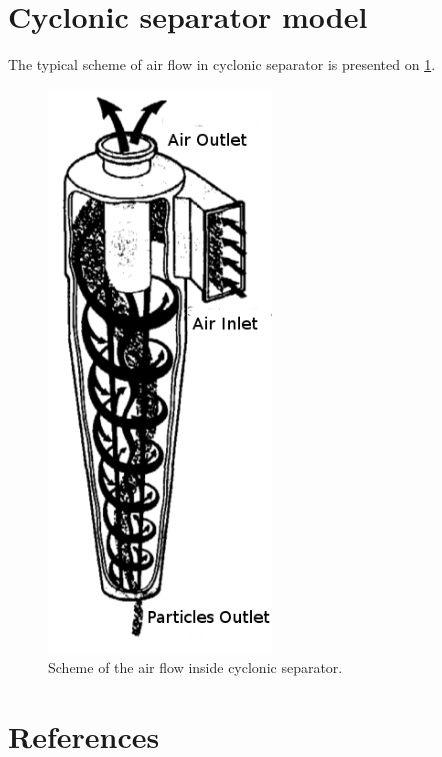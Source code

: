 \documentclass[a4paper]{jpconf}
\begin{document}
\section{Cyclonic separator model}
The typical scheme of air flow in cyclonic separator is presented on \cref{fig:physicalModel}.	
\begin{figure}[h]
\includegraphics[width=14pc]{flowScheme1.png}\hspace{2pc}%
\begin{minipage}[b]{14pc}\caption{\label{fig:physicalModel}Scheme of the air flow inside cyclonic separator.}
\end{minipage}
\end{figure}

\section*{References}

\end{document}
